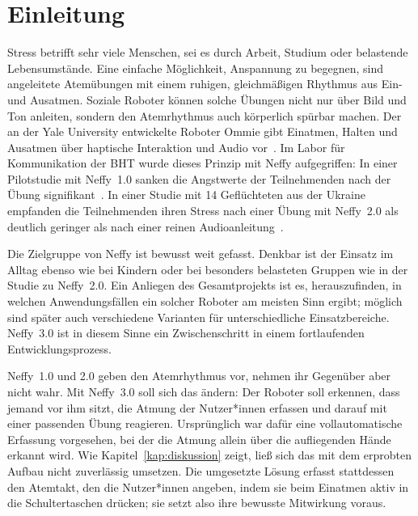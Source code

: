 \chapter{Einleitung}
\label{kap:einleitung}

Stress betrifft sehr viele Menschen, sei es durch Arbeit, Studium oder belastende
Lebensumstände. Eine einfache Möglichkeit, Anspannung zu begegnen, sind angeleitete
Atemübungen mit einem ruhigen, gleichmäßigen Rhythmus aus Ein- und Ausatmen. Soziale Roboter
können solche Übungen nicht nur über Bild und Ton anleiten, sondern den Atemrhythmus auch
körperlich spürbar machen. Der an der Yale University entwickelte Roboter Ommie gibt Einatmen,
Halten und Ausatmen über haptische Interaktion und Audio vor~\cite{matheus2022ommie}. Im Labor
für Kommunikation der \ac{BHT} wurde dieses Prinzip mit Neffy aufgegriffen: In einer
Pilotstudie mit Neffy~1.0 sanken die Angstwerte der Teilnehmenden nach der Übung
signifikant~\cite{thomas2025neffy}. In einer Studie mit 14 Geflüchteten aus der Ukraine
empfanden die Teilnehmenden ihren Stress nach einer Übung mit Neffy~2.0 als deutlich geringer
als nach einer reinen Audioanleitung~\cite{buchem2026neffy2}.

Die Zielgruppe von Neffy ist bewusst weit gefasst. Denkbar ist der Einsatz im Alltag ebenso
wie bei Kindern oder bei besonders belasteten Gruppen wie in der Studie zu Neffy~2.0. Ein
Anliegen des Gesamtprojekts ist es, herauszufinden, in welchen Anwendungsfällen ein solcher
Roboter am meisten Sinn ergibt; möglich sind später auch verschiedene Varianten für
unterschiedliche Einsatzbereiche. Neffy~3.0 ist in diesem Sinne ein Zwischenschritt in einem
fortlaufenden Entwicklungsprozess.

Neffy~1.0 und 2.0 geben den Atemrhythmus vor, nehmen ihr Gegenüber aber nicht wahr. Mit
Neffy~3.0 soll sich das ändern: Der Roboter soll erkennen, dass jemand vor ihm sitzt, die
Atmung der Nutzer*innen erfassen und darauf mit einer passenden Übung reagieren. Ursprünglich
war dafür eine vollautomatische Erfassung vorgesehen, bei der die Atmung allein über die
aufliegenden Hände erkannt wird. Wie Kapitel~\ref{kap:diskussion} zeigt, ließ sich das mit dem
erprobten Aufbau nicht zuverlässig umsetzen. Die umgesetzte Lösung erfasst stattdessen den
Atemtakt, den die Nutzer*innen angeben, indem sie beim Einatmen aktiv in die Schultertaschen
drücken; sie setzt also ihre bewusste Mitwirkung voraus.

